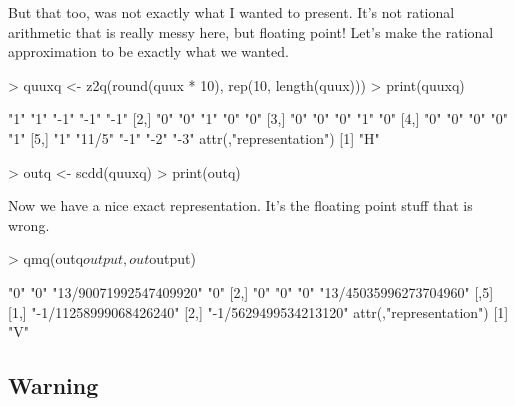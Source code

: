 \documentclass{article}
\begin{document}
But that too, was not exactly what I wanted to present.
It's not rational arithmetic that is really messy here,
but floating point!  Let's make the rational approximation
to be exactly what we wanted.
\begin{Schunk}
\begin{Sinput}
> quuxq <- z2q(round(quux * 10), rep(10, length(quux)))
> print(quuxq)
\end{Sinput}
\begin{Soutput}
     [,1] [,2]   [,3] [,4] [,5]
[1,] "1"  "1"    "-1" "-1" "-1"
[2,] "0"  "0"    "1"  "0"  "0" 
[3,] "0"  "0"    "0"  "1"  "0" 
[4,] "0"  "0"    "0"  "0"  "1" 
[5,] "1"  "11/5" "-1" "-2" "-3"
attr(,"representation")
[1] "H"
\end{Soutput}
\begin{Sinput}
> outq <- scdd(quuxq)
> print(outq)
\end{Sinput}
\end{Schunk}
Now we have a nice exact representation.  It's the floating
point stuff that is wrong.
\begin{Schunk}
\begin{Sinput}
> qmq(outq$output, out$output)
\end{Sinput}
\begin{Soutput}
     [,1] [,2] [,3]                   [,4]                  
[1,] "0"  "0"  "13/90071992547409920" "0"                   
[2,] "0"  "0"  "0"                    "13/45035996273704960"
     [,5]                  
[1,] "-1/11258999068426240"
[2,] "-1/5629499534213120" 
attr(,"representation")
[1] "V"
\end{Soutput}
\end{Schunk}

\subsection{Warning} \label{sec:warn}
\end{document}
